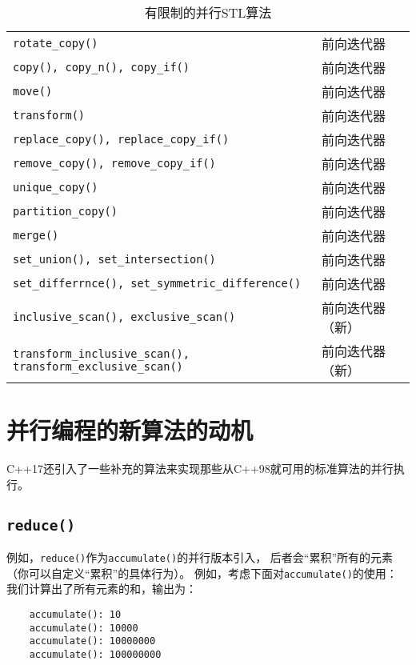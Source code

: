 \begin{table}[ht]
\begin{tabular}{l|l}
        \texttt{rotate\_copy()}                                             & 前向迭代器                   \\
        \texttt{copy(), copy\_n(), copy\_if()}                              & 前向迭代器                   \\
        \texttt{move()}                                                     & 前向迭代器                   \\
        \texttt{transform()}                                                & 前向迭代器                   \\
        \texttt{replace\_copy(), replace\_copy\_if()}                       & 前向迭代器                   \\
        \texttt{remove\_copy(), remove\_copy\_if()}                         & 前向迭代器                   \\
        \texttt{unique\_copy()}                                             & 前向迭代器                   \\
        \texttt{partition\_copy()}                                          & 前向迭代器                   \\
        \texttt{merge()}                                                    & 前向迭代器                   \\
        \texttt{set\_union(), set\_intersection()}                          & 前向迭代器                   \\
        \texttt{set\_differrnce(), set\_symmetric\_difference()}            & 前向迭代器                   \\
        \texttt{inclusive\_scan(), exclusive\_scan()}                       & 前向迭代器（新）                \\
        \texttt{transform\_inclusive\_scan(), transform\_exclusive\_scan()} & 前向迭代器（新）                \\
        \hline
    \end{tabular}
    \caption{有限制的并行STL算法}
    \label{t22.4}
\end{table}


\section{并行编程的新算法的动机}
C++17还引入了一些补充的算法来实现那些从C++98就可用的标准算法的并行执行。

\subsection{\texttt{reduce()}}
例如，\texttt{reduce()}作为\texttt{accumulate()}的并行版本引入，
后者会“累积”所有的元素（你可以自定义“累积”的具体行为）。
例如，考虑下面对\texttt{accumulate()}的使用：
我们计算出了所有元素的和，输出为：
\begin{lstlisting}
    accumulate(): 10
    accumulate(): 10000
    accumulate(): 10000000
    accumulate(): 100000000
\end{lstlisting}

